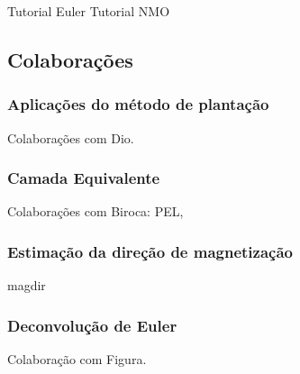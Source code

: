 Tutorial Euler
Tutorial NMO


\subsection{Colaborações}


\subsubsection{Aplicações do método de plantação}

Colaborações com Dio.


\subsubsection{Camada Equivalente}

Colaborações com Biroca: PEL,


\subsubsection{Estimação da direção de magnetização}

magdir


\subsubsection{Deconvolução de Euler}

Colaboração com Figura.
